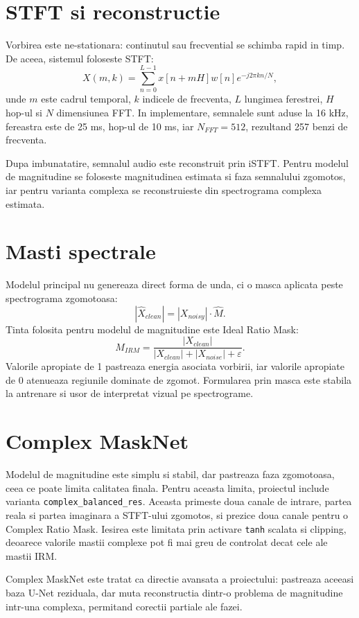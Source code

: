 \documentclass[12pt,a4paper]{report}
\begin{document}
\section{STFT si reconstructie}

Vorbirea este ne-stationara: continutul sau frecvential se schimba rapid in
timp. De aceea, sistemul foloseste STFT:
\[
X(m,k)=\sum_{n=0}^{L-1}x[n+mH]w[n]e^{-j2\pi kn/N},
\]
unde \(m\) este cadrul temporal, \(k\) indicele de frecventa, \(L\) lungimea
ferestrei, \(H\) hop-ul si \(N\) dimensiunea FFT. In implementare, semnalele
sunt aduse la 16 kHz, fereastra este de 25 ms, hop-ul de 10 ms, iar
\(N_{FFT}=512\), rezultand 257 benzi de frecventa.

Dupa imbunatatire, semnalul audio este reconstruit prin iSTFT. Pentru modelul
de magnitudine se foloseste magnitudinea estimata si faza semnalului zgomotos,
iar pentru varianta complexa se reconstruieste din spectrograma complexa
estimata.

\section{Masti spectrale}

Modelul principal nu genereaza direct forma de unda, ci o masca aplicata peste
spectrograma zgomotoasa:
\[
|\hat{X}_{clean}| = |X_{noisy}| \cdot \hat{M}.
\]
Tinta folosita pentru modelul de magnitudine este Ideal Ratio Mask:
\[
M_{IRM}=\frac{|X_{clean}|}{|X_{clean}|+|X_{noise}|+\varepsilon}.
\]
Valorile apropiate de 1 pastreaza energia asociata vorbirii, iar valorile
apropiate de 0 atenueaza regiunile dominate de zgomot. Formularea prin masca
este stabila la antrenare si usor de interpretat vizual pe spectrograme.

\section{Complex MaskNet}

Modelul de magnitudine este simplu si stabil, dar pastreaza faza zgomotoasa,
ceea ce poate limita calitatea finala. Pentru aceasta limita, proiectul include
varianta \texttt{complex\_balanced\_res}. Aceasta primeste doua canale de
intrare, partea reala si partea imaginara a STFT-ului zgomotos, si prezice doua
canale pentru o Complex Ratio Mask. Iesirea este limitata prin activare
\texttt{tanh} scalata si clipping, deoarece valorile mastii complexe pot fi mai
greu de controlat decat cele ale mastii IRM.

Complex MaskNet este tratat ca directie avansata a proiectului: pastreaza
aceeasi baza U-Net reziduala, dar muta reconstructia dintr-o problema de
magnitudine intr-una complexa, permitand corectii partiale ale fazei.
\end{document}

